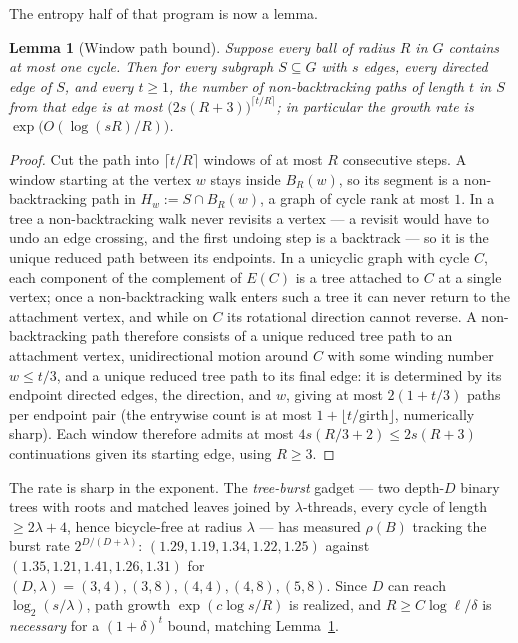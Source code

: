 \documentclass[11pt]{article}
\newtheorem{lemma}{Lemma}
\theoremstyle{remark}
\begin{document}
The entropy half of that program is now a lemma.

\begin{lemma}[Window path bound]\label{lem:window}
Suppose every ball of radius $R$ in $G$ contains at most one cycle.
Then for every subgraph $S\subseteq G$ with $s$ edges, every directed
edge of $S$, and every $t\ge1$, the number of non-backtracking paths
of length $t$ in $S$ from that edge is at most
$\big(2s(R+3)\big)^{\lceil t/R\rceil}$; in particular the growth rate
is $\exp\!\big(O(\log(sR)/R)\big)$.
\end{lemma}

\begin{proof}
Cut the path into $\lceil t/R\rceil$ windows of at most $R$
consecutive steps. A window starting at the vertex $w$ stays inside
$B_R(w)$, so its segment is a non-backtracking path in
$H_w:=S\cap B_R(w)$, a graph of cycle rank at most $1$. In a tree a
non-backtracking walk never revisits a vertex --- a revisit would have
to undo an edge crossing, and the first undoing step is a backtrack
--- so it is the unique reduced path between its endpoints. In a
unicyclic graph with cycle $C$, each component of the complement of
$E(C)$ is a tree attached to $C$ at a single vertex; once a
non-backtracking walk enters such a tree it can never return to the
attachment vertex, and while on $C$ its rotational direction cannot
reverse. A non-backtracking path therefore consists of a unique
reduced tree path to an attachment vertex, unidirectional motion
around $C$ with some winding number $w\le t/3$, and a unique reduced
tree path to its final edge: it is determined by its endpoint directed
edges, the direction, and $w$, giving at most $2(1+t/3)$ paths per
endpoint pair (the entrywise count is at most $1+\lfloor t/\mathrm{girth}\rfloor$, numerically sharp). Each
window therefore admits at most $4s(R/3+2)\le2s(R+3)$
continuations given its starting edge, using $R\ge3$.
\end{proof}

The rate is sharp in the exponent. The \emph{tree-burst} gadget ---
two depth-$D$ binary trees with roots and matched leaves joined by
$\lambda$-threads, every cycle of length $\ge2\lambda+4$, hence
bicycle-free at radius $\lambda$ --- has measured $\rho(B)$ tracking
the burst rate $2^{D/(D+\lambda)}$: $(1.29,1.19,1.34,1.22,1.25)$
against $(1.35,1.21,1.41,1.26,1.31)$ for
$(D,\lambda)=(3,4),(3,8),(4,4),(4,8),(5,8)$. Since $D$ can reach
$\log_2(s/\lambda)$, path growth $\exp(c\log s/R)$ is realized, and
$R\ge C\log\ell/\delta$ is \emph{necessary} for a $(1+\delta)^t$
bound, matching Lemma~\ref{lem:window}.
\end{document}
